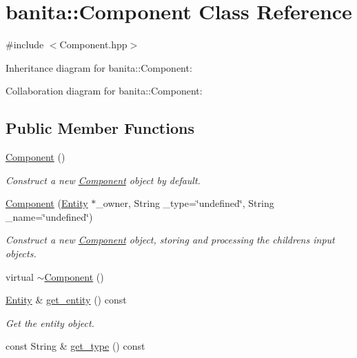 \hypertarget{classbanita_1_1_component}{}\section{banita\+::Component Class Reference}
\label{classbanita_1_1_component}


{\ttfamily \#include $<$Component.\+hpp$>$}



Inheritance diagram for banita\+::Component\+:


Collaboration diagram for banita\+::Component\+:
\subsection*{Public Member Functions}
\begin{DoxyCompactItemize}
\item 
\mbox{\hyperlink{classbanita_1_1_component_ad73a6ae8fbf56b7d54ef48c5e9ec164d}{Component}} ()
\begin{DoxyCompactList}\small\item\em Construct a new \mbox{\hyperlink{classbanita_1_1_component}{Component}} object by default. \end{DoxyCompactList}\item 
\mbox{\hyperlink{classbanita_1_1_component_a3a267ceeceda4ed4f9c7dba7d11f4886}{Component}} (\mbox{\hyperlink{classbanita_1_1_entity}{Entity}} $\ast$\+\_\+owner, String \+\_\+type=\char`\"{}undefined\char`\"{}, String \+\_\+name=\char`\"{}undefined\char`\"{})
\begin{DoxyCompactList}\small\item\em Construct a new \mbox{\hyperlink{classbanita_1_1_component}{Component}} object, storing and processing the children\textquotesingle{}s input objects. \end{DoxyCompactList}\item 
virtual \mbox{\hyperlink{classbanita_1_1_component_a0dc114b2bed0ec1128b20bbf2b5e2eca}{$\sim$\+Component}} ()
\item 
\mbox{\hyperlink{classbanita_1_1_entity}{Entity}} \& \mbox{\hyperlink{classbanita_1_1_component_a054621244d350d5b8e8543dd3ddd8a61}{get\+\_\+entity}} () const
\begin{DoxyCompactList}\small\item\em Get the entity object. \end{DoxyCompactList}\item 
const String \& \mbox{\hyperlink{classbanita_1_1_component_a69929c9ea05264cc3625c9475de6489d}{get\+\_\+type}} () const

\end{DoxyCompactItemize}
